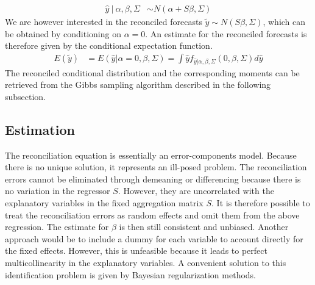 \documentclass[a4paper,fleqn,11pt]{article}
\begin{document}
\begin{align}
\hat{y}\ |\ \alpha,\beta,\Sigma &\sim N(\alpha + S\beta,\Sigma)
\end{align}
We are however interested in the reconciled forecasts $\tilde{y} \sim N(S\beta,\Sigma)$, which can be obtained by conditioning on $\alpha = 0$. An estimate for the reconciled forecasts is therefore given by the conditional expectation function.
\begin{align}
	E(\tilde{y}) &= E(\hat{y}|\alpha = 0,\beta,\Sigma) = \int \hat{y} f_{\hat{y}|\alpha,\beta,\Sigma}(0,\beta,\Sigma) d\hat{y} 
\end{align}
The reconciled conditional distribution and the corresponding moments can be retrieved from the Gibbs sampling algorithm described in the following subsection.\\

\subsection{Estimation}
The reconciliation equation is essentially an error-components model. Because there is no unique solution, it represents an ill-posed problem. The reconciliation errors cannot be eliminated through demeaning or differencing because there is no variation in the regressor $S$. However, they are uncorrelated with the explanatory variables in the fixed aggregation matrix $S$. It is therefore possible to treat the reconciliation errors as random effects and omit them from the above regression. The estimate for $\beta$ is then still consistent and unbiased. Another approach would be to include a dummy for each variable to account directly for the fixed effects. However, this is unfeasible because it leads to perfect multicollinearity in the explanatory variables. A convenient solution to this identification problem is given by Bayesian regularization methods.\\
\end{document}
